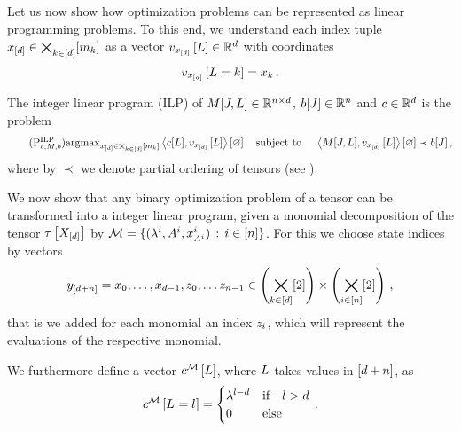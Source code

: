 
Let us now show how optimization problems can be represented as linear programming problems.
To this end, we understand each index tuple $x_{[d]}\in\bigtimes_{k\in[d]}[m_{k}]$ as a vector $v_{x_{[d]}}\left[L\right]\in\mathbb{R}^{d}$ with coordinates
\begin{align*}
    v_{x_{[d]}}\left[L=k\right] = x_{k} \, .
\end{align*}

\begin{definition}
    The integer linear program (ILP) of $M[J,L]\in\mathbb{R}^{n \times d}$, $b[J]\in\mathbb{R}^{n}$ and $c\in\mathbb{R}^{d}$ is the problem
    \begin{align}
        \tag{$\probtagtypeinst{\mathrm{ILP}}{\objectivesymbol,\exmatrix,\rhssymbol}$}
        \argmax_{\shortcatindices\in\facstates} \contraction{\objectivesymbol[\selvariable], \statevectorofat{\shortcatindices}{\selvariable}}
        \quad \text{subject to } \quad \contraction{\matrixat{\datvariable,\selvariable},\statevectorofat{\shortcatindices}{\selvariable}} \prec \rhssymbol[\datvariable] \, ,
    \end{align}
    where by $\prec$ we denote partial ordering of tensors (see ).
\end{definition}


We now show that any binary optimization problem of a tensor can be transformed into a integer linear program, given a monomial decomposition of the tensor $\tau\left[X_{[d]}\right]$ by $\mathcal{M}=\{(\lambda^{i}, A^{i}, x_{A^{i}}^{i}) \, : \, i\in[n]\}$.
For this we choose state indices by vectors
\begin{align*}
    y_{[d+n]} = x_{0},\ldots,x_{d-1},z_{0},\ldots z_{n-1} \in \left(\bigtimes_{k\in[d]}[2]\right) \times  \left(\bigtimes_{i\in[n]}[2]\right) \, ,
\end{align*}
that is we added for each monomial an index $z_{i}$, which will represent the evaluations of the respective monomial.


We furthermore define a vector $c^{\mathcal{M}}\left[L\right]$, where $L$ takes values in $[d+n]$, as
\begin{align}
    \label{eq:ilpPotential}
    \objofat{\sliceset}{\indexedselvariable} =
    \begin{cases}
        \slicescalarof{\selindex-\catorder} & \ifspace \selindex>\catorder \\%
        0 & \text{else}
    \end{cases} \, .
\end{align}

